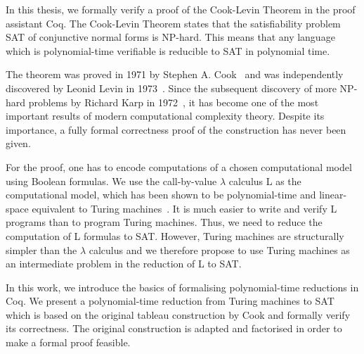 In this thesis, we formally verify a proof of the Cook-Levin Theorem in the proof assistant Coq.
The Cook-Levin Theorem states that the satisfiability problem SAT of conjunctive normal forms is NP-hard. 
This means that any language which is polynomial-time verifiable is reducible to SAT in polynomial time. 

The theorem was proved in 1971 by Stephen A. Cook~\cite{cook_theorem} and was independently discovered by Leonid Levin in 1973~\cite{levin_theorem}.
Since the subsequent discovery of more NP-hard problems by Richard Karp in 1972~\cite{Karp1972}, it has become one of the most important results of modern computational complexity theory.
Despite its importance, a fully formal correctness proof of the construction has never been given.

For the proof, one has to encode computations of a chosen computational model using Boolean formulas. 
We use the call-by-value $\lambda$ calculus L as the computational model, which has been shown to be polynomial-time and linear-space equivalent to Turing machines~\cite{ForsterKunzeRoth:2019:wcbv-Reasonable}. It is much easier to write and verify L programs than to program Turing machines.
Thus, we need to reduce the computation of L formulas to SAT.
However, Turing machines are structurally simpler than the $\lambda$ calculus and we therefore propose to use Turing machines as an intermediate problem in the reduction of L to SAT.


In this work, we introduce the basics of formalising polynomial-time reductions in Coq. We present a polynomial-time reduction from Turing machines to SAT which is based on the original tableau construction by Cook and formally verify its correctness. The original construction is adapted and factorised in order to make a formal proof feasible.


